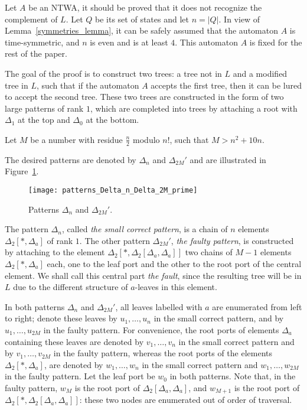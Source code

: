 \documentclass[12pt,a4paper]{article}
\theoremstyle{definition}
\begin{document}
Let $A$ be an NTWA, it should be proved that it does not recognize the complement of $L$.
Let $Q$ be its set of states and let $n=|Q|$.
In view of Lemma~\ref{symmetries_lemma},
it can be safely assumed that the automaton $A$
is time-symmetric, and $n$ is even and is at least $4$.
This automaton $A$ is fixed for the rest of the paper.

The goal of the proof is to construct two trees:
a tree not in $L$ and a modified tree in $L$, such that if the automaton $A$ accepts
the first tree, then it can be lured to accept the second tree.
These two trees are constructed in the form of two large patterns of rank $1$,
which are completed into trees by attaching a root with $\Delta_1$ at the top
and $\Delta_0$ at the bottom.

Let $M$ be a number with residue $\frac{n}{2}$ modulo $n!$,
such that $M > n^2+10n$.

The desired patterns are denoted by $\Delta_{n}$ and $\Delta_{2M}'$
and are illustrated in Figure~\ref{f:patterns_Delta_n_Delta_2M_prime}.
\begin{figure}[t]
	\centerline{\texttt{[image: patterns\_Delta\_n\_Delta\_2M\_prime]}}
	\caption{Patterns $\Delta_n$ and $\Delta_{2M}'$.}
	\label{f:patterns_Delta_n_Delta_2M_prime}
\end{figure}
The pattern $\Delta_n$, called \emph{the small correct pattern},
is a chain of $n$ elements $\Delta_2[*,\Delta_a]$ of rank $1$.
The other pattern $\Delta_{2M}'$, \emph{the faulty pattern},
is constructed by attaching to the element $\Delta_2[*,\Delta_2[\Delta_a,\Delta_a]]$
two chains of $M-1$ elements $\Delta_2[*,\Delta_a]$ each,
one to the leaf port and the other to the root port of the central element.
We shall call this central part \emph{the fault},
since the resulting tree will be in $L$
due to the different structure of $a$-leaves in this element.

In both patterns $\Delta_n$ and $\Delta_{2M}'$,
all leaves labelled with $a$ are enumerated from left to right;
denote these leaves by $u_1, \ldots, u_n$ in the small correct pattern,
and by $u_1, \ldots, u_{2M}$ in the faulty pattern.
For convenience, the root ports of elements $\Delta_a$ containing these leaves
are denoted by $v_1, \ldots, v_n$ in the small correct pattern
and by $v_1, \ldots, v_{2M}$ in the faulty pattern,
whereas the root ports of the elements $\Delta_2[*,\Delta_a]$,
are denoted by $w_1,\ldots,w_n$ in the small correct pattern
and $w_1,\ldots,w_{2M}$ in the faulty pattern.
Let the leaf port be $w_0$ in both patterns.
Note that, in the faulty pattern, $w_M$ is the root port of $\Delta_2[\Delta_a,\Delta_a]$,
and $w_{M+1}$ is the root port of $\Delta_2[*,\Delta_2[\Delta_a,\Delta_a]]$:
these two nodes are enumerated out of order of traversal.
\end{document}
